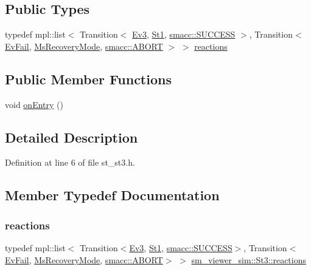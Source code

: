 \subsection*{Public Types}
\begin{DoxyCompactItemize}
\item 
typedef mpl\+::list$<$ Transition$<$ \hyperlink{structsm__viewer__sim_1_1Ev3}{Ev3}, \hyperlink{structsm__viewer__sim_1_1St1}{St1}, \hyperlink{structsmacc_1_1default__transition__tags_1_1SUCCESS}{smacc\+::\+S\+U\+C\+C\+E\+SS} $>$, Transition$<$ \hyperlink{structsm__viewer__sim_1_1EvFail}{Ev\+Fail}, \hyperlink{structsm__viewer__sim_1_1MsRecoveryMode}{Ms\+Recovery\+Mode}, \hyperlink{structsmacc_1_1default__transition__tags_1_1ABORT}{smacc\+::\+A\+B\+O\+RT} $>$ $>$ \hyperlink{structsm__viewer__sim_1_1St3_a2e8b99a067cc1faaadaa42381e0fc34f}{reactions}
\end{DoxyCompactItemize}
\subsection*{Public Member Functions}
\begin{DoxyCompactItemize}
\item 
void \hyperlink{structsm__viewer__sim_1_1St3_a283ea2f506562090b95a40183c6b4f41}{on\+Entry} ()
\end{DoxyCompactItemize}


\subsection{Detailed Description}


Definition at line 6 of file st\+\_\+st3.\+h.



\subsection{Member Typedef Documentation}
\mbox{\label{structsm__viewer__sim_1_1St3_a2e8b99a067cc1faaadaa42381e0fc34f}} 
\subsubsection{\texorpdfstring{reactions}{reactions}}
{\footnotesize\ttfamily typedef mpl\+::list$<$ Transition$<$\hyperlink{structsm__viewer__sim_1_1Ev3}{Ev3}, \hyperlink{structsm__viewer__sim_1_1St1}{St1}, \hyperlink{structsmacc_1_1default__transition__tags_1_1SUCCESS}{smacc\+::\+S\+U\+C\+C\+E\+SS}$>$, Transition$<$\hyperlink{structsm__viewer__sim_1_1EvFail}{Ev\+Fail}, \hyperlink{structsm__viewer__sim_1_1MsRecoveryMode}{Ms\+Recovery\+Mode}, \hyperlink{structsmacc_1_1default__transition__tags_1_1ABORT}{smacc\+::\+A\+B\+O\+RT}$>$ $>$ \hyperlink{structsm__viewer__sim_1_1St3_a2e8b99a067cc1faaadaa42381e0fc34f}{sm\+\_\+viewer\+\_\+sim\+::\+St3\+::reactions}}



